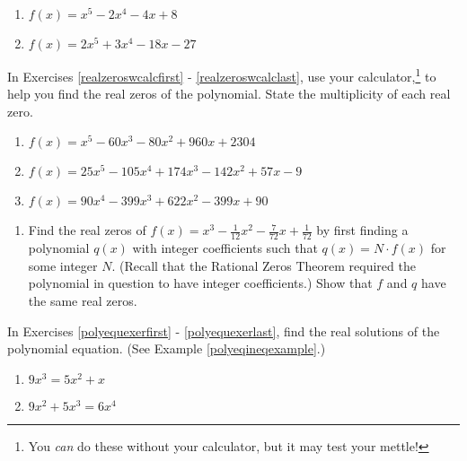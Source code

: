 \begin{multicols}{2}
\begin{enumerate}
\setcounter{enumi}{\value{HW}}

\item $f(x) = x^5-2x^4-4x+8$
\item $f(x) = 2x^5+3x^4-18x-27$ \label{findrealzerosexerlast}

\setcounter{HW}{\value{enumi}}
\end{enumerate}
\end{multicols}

\pagebreak

In Exercises \ref{realzeroswcalcfirst} - \ref{realzeroswcalclast}, use your calculator,\footnote{You \textit{can} do these without your calculator, but it may test your mettle!} to help you find the real zeros of the polynomial.  State the multiplicity of each real zero.

\begin{enumerate}
\setcounter{enumi}{\value{HW}}

\item $f(x) = x^{5} - 60x^{3} - 80x^{2} + 960x + 2304$ \label{realzeroswcalcfirst}
\item $f(x) = 25x^{5} - 105x^{4} + 174x^{3} - 142x^{2} + 57x - 9$
\item $f(x) = 90x^{4} - 399x^{3} + 622x^{2} - 399x + 90$ \label{realzeroswcalclast}

\setcounter{HW}{\value{enumi}}
\end{enumerate}

\begin{enumerate}
\setcounter{enumi}{\value{HW}}

\item Find the real zeros of $f(x) = x^{3} - \frac{1}{12}x^{2} - \frac{7}{72}x + \frac{1}{72}$ by first finding a polynomial $q(x)$ with integer coefficients such that $q(x) = N \cdot f(x)$ for some integer $N$.  (Recall that the Rational Zeros Theorem required the polynomial in question to have integer coefficients.) Show that $f$ and $q$ have the same real zeros.

\setcounter{HW}{\value{enumi}}
\end{enumerate}

In Exercises \ref{polyequexerfirst} - \ref{polyequexerlast}, find the real solutions of the polynomial equation.  (See Example \ref{polyeqineqexample}.)

\begin{multicols}{2}
\begin{enumerate}
\setcounter{enumi}{\value{HW}}

\item  $9x^{3} = 5x^{2} + x$  \label{polyequexerfirst} 
\item $9x^{2}+5x^{3}= 6x^{4}$  

\setcounter{HW}{\value{enumi}}
\end{enumerate}
\end{multicols}

